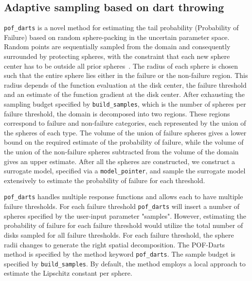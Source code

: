 \subsection{Adaptive sampling based on dart throwing}\label{uq:adaptive:darts}
\texttt{pof\_darts} is a novel method for estimating the tail probability
(Probability of Failure) based on random sphere-packing in the uncertain
parameter space. Random points are sequentially sampled from the domain and
consequently surrounded by protecting spheres, with the constraint that each new
sphere center has to be outside all prior spheres~\cite{ebeida2016pof}. The
radius of each sphere is chosen such that the entire sphere lies either in the
failure or the non-failure region. This radius depends of the function
evaluation at the disk center, the failure threshold and an estimate of the
function gradient at the disk center. After exhausting the sampling budget
specified by \texttt{build\_samples}, which is the number of spheres per failure
threshold, the domain is decomposed into two regions.  These regions correspond
to failure and non-failure categories, each represented by the union of the
spheres of each type. The volume of the union of failure spheres gives a lower
bound on the required estimate of the probability of failure, while the volume
of the union of the non-failure spheres subtracted from the volume of the domain
gives an upper estimate. After all the spheres are constructed, we construct a
surrogate model, specified via a \texttt{model\_pointer}, and sample the
surrogate model extensively to estimate the probability of failure for each
threshold. 

\texttt{pof\_darts} handles multiple response functions and allows each to have
multiple failure thresholds. For each failure threshold \texttt{pof\_darts} will
insert a number of spheres specified by the user-input parameter "samples".
However, estimating the probability of failure for each failure threshold would
utilize the total number of disks sampled for all failure thresholds. For each
failure threshold, the sphere radii changes to generate the right spatial
decomposition. The POF-Darts method is specified by the method keyword
\texttt{pof\_darts}. The sample budget is specified by \texttt{build\_samples}.
By default, the method employs a local approach to estimate the Lipschitz
constant per sphere.

